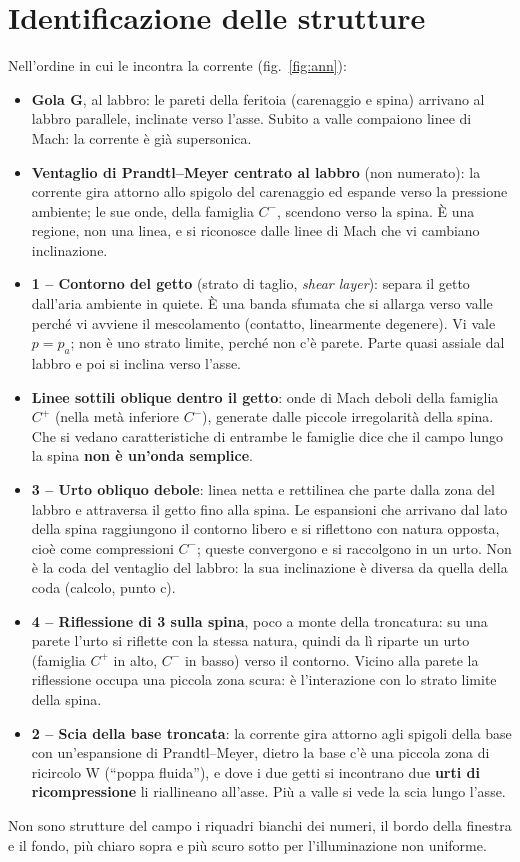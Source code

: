 \documentclass[11pt,a4paper]{article}
\newcommand{\Cp}{C^{+}}
\newcommand{\Cm}{C^{-}}
\begin{document}
\section{Identificazione delle strutture}
Nell'ordine in cui le incontra la corrente (fig.~\ref{fig:ann}):
\begin{itemize}
\item \textbf{Gola G}, al labbro: le pareti della feritoia (carenaggio e spina) arrivano al labbro parallele,
  inclinate verso l'asse. Subito a valle compaiono linee di Mach: la corrente è già supersonica.
\item \textbf{Ventaglio di Prandtl--Meyer centrato al labbro} (non numerato): la corrente gira attorno allo spigolo
  del carenaggio ed espande verso la pressione ambiente; le sue onde, della famiglia $\Cm$, scendono verso la spina.
  È una regione, non una linea, e si riconosce dalle linee di Mach che vi cambiano inclinazione.
\item \textbf{1 -- Contorno del getto} (strato di taglio, \emph{shear layer}): separa il getto dall'aria ambiente in
  quiete. È una banda sfumata che si allarga verso valle perché vi avviene il mescolamento (contatto, linearmente
  degenere). Vi vale $p=p_a$; non è uno strato limite, perché non c'è parete. Parte quasi assiale dal labbro e poi si
  inclina verso l'asse.
\item \textbf{Linee sottili oblique dentro il getto}: onde di Mach deboli della famiglia $\Cp$ (nella metà inferiore
  $\Cm$), generate dalle piccole irregolarità della spina. Che si vedano caratteristiche di entrambe le famiglie dice
  che il campo lungo la spina \textbf{non è un'onda semplice}.
\item \textbf{3 -- Urto obliquo debole}: linea netta e rettilinea che parte dalla zona del labbro e attraversa il getto
  fino alla spina. Le espansioni che arrivano dal lato della spina raggiungono il contorno libero e si riflettono con
  natura opposta, cioè come compressioni $\Cm$; queste convergono e si raccolgono in un urto. Non è la coda del
  ventaglio del labbro: la sua inclinazione è diversa da quella della coda (calcolo, punto c).
\item \textbf{4 -- Riflessione di 3 sulla spina}, poco a monte della troncatura: su una parete l'urto si riflette con
  la stessa natura, quindi da lì riparte un urto (famiglia $\Cp$ in alto, $\Cm$ in basso) verso il contorno. Vicino
  alla parete la riflessione occupa una piccola zona scura: è l'interazione con lo strato limite della spina.
\item \textbf{2 -- Scia della base troncata}: la corrente gira attorno agli spigoli della base con un'espansione di
  Prandtl--Meyer, dietro la base c'è una piccola zona di ricircolo W (``poppa fluida''), e dove i due getti si
  incontrano due \textbf{urti di ricompressione} li riallineano all'asse. Più a valle si vede la scia lungo l'asse.
\end{itemize}
Non sono strutture del campo i riquadri bianchi dei numeri, il bordo della finestra e il fondo, più chiaro sopra e più
scuro sotto per l'illuminazione non uniforme.
\end{document}
